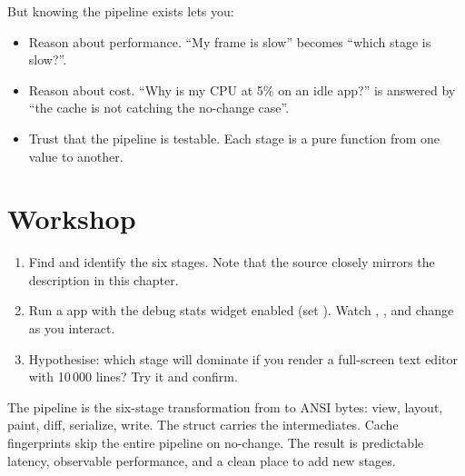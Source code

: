 But knowing the pipeline exists lets you:

\begin{itemize}[leftmargin=*]
  \item Reason about performance. ``My frame is slow'' becomes
    ``which stage is slow?''.
  \item Reason about cost. ``Why is my CPU at 5\% on an idle
    app?'' is answered by ``the cache is not catching the
    no-change case''.
  \item Trust that the pipeline is testable. Each stage is a
    pure function from one value to another.
\end{itemize}

\section*{Workshop}

\begin{enumerate}[leftmargin=*]
  \item Find  and
    identify the six stages. Note that the source closely
    mirrors the description in this chapter.
  \item Run a \maya{} app with the debug stats widget enabled
    (set ). Watch ,
    , and  change as
    you interact.
  \item Hypothesise: which stage will dominate if you render a
    full-screen text editor with 10\,000 lines? Try it and
    confirm.
\end{enumerate}

\begin{recap}
The pipeline is the six-stage transformation from  to
ANSI bytes: view, layout, paint, diff, serialize, write. The
 struct carries the intermediates. Cache
fingerprints skip the entire pipeline on no-change. The result is
predictable latency, observable performance, and a clean place to
add new stages.
\end{recap}
